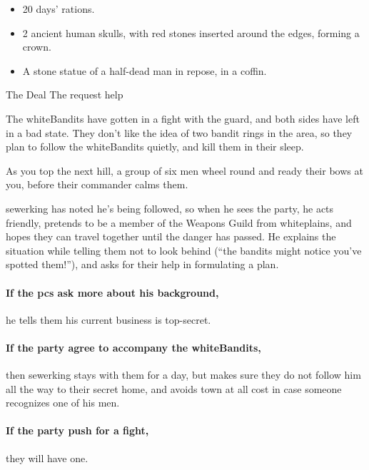 \begin{itemize}
  \item
  20 days' rations.
  \item
  2 ancient human skulls, with red stones inserted around the edges, forming a crown.
  \item
  A stone statue of a half-dead man in repose, in a coffin.
\end{itemize}

{The Deal}%
{The  request help}%

The \gls{whiteBandits} have gotten in a fight with the \gls{guard}, and both sides have left in a bad state.
They don't like the idea of two bandit rings in the area, so they plan to follow the \gls{whiteBandits} quietly, and kill them in their sleep.

\begin{boxtext}

  As you top the next hill, a group of six men wheel round and ready their bows at you, before their commander calms them.

\end{boxtext}

\Gls{sewerking} has noted he's being followed, so when he sees the party, he acts friendly, pretends to be a member of the Weapons Guild from \Gls{whiteplains}, and hopes they can travel together until the danger has passed.
He explains the situation while telling them not to look behind (``the bandits might notice you've spotted them!''), and asks for their help in formulating a plan.

\paragraph{If the \glspl{pc} ask more about his background,}
he tells them his current business is top-secret.

\sewerking


\paragraph{If the party agree to accompany the \gls{whiteBandits},}
then \gls{sewerking} stays with them for a day, but makes sure they do not follow him all the way to their secret home, and avoids town at all cost in case someone recognizes one of his men.

\paragraph{If the party push for a fight,}
they will have one.

